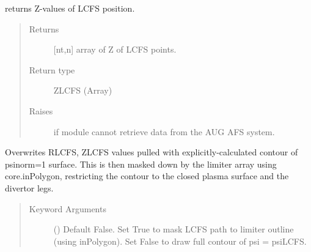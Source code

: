 \documentclass[letterpaper,10pt,english]{sphinxmanual}
\begin{document}
\begin{fulllineitems}
\begin{fulllineitems}
\begin{quote}
\begin{description}
\end{description}\end{quote}

\end{fulllineitems}


\begin{fulllineitems}
\label{\detokenize{eqtools:eqtools.AUGData.AUGDDData.getZLCFS}}
returns Z-values of LCFS position.
\begin{quote}\begin{description}
\item[{Returns}] \leavevmode
{[}nt,n{]} array of Z of LCFS points.

\item[{Return type}] \leavevmode
ZLCFS (Array)

\item[{Raises}] \leavevmode
{} \textendash{} if module cannot retrieve data from the AUG AFS system.

\end{description}\end{quote}

\end{fulllineitems}


\begin{fulllineitems}
\label{\detokenize{eqtools:eqtools.AUGData.AUGDDData.remapLCFS}}
Overwrites RLCFS, ZLCFS values pulled with explicitly-calculated
contour of psinorm=1 surface.  This is then masked down by the limiter
array using core.inPolygon, restricting the contour to the closed
plasma surface and the divertor legs.
\begin{quote}\begin{description}
\item[{Keyword Arguments}] \leavevmode
{} () \textendash{} Default False.  Set True to mask LCFS path to
limiter outline (using inPolygon).  Set False to draw full
contour of psi = psiLCFS.


\end{description}
\end{quote}
\end{fulllineitems}
\end{fulllineitems}
\end{document}
